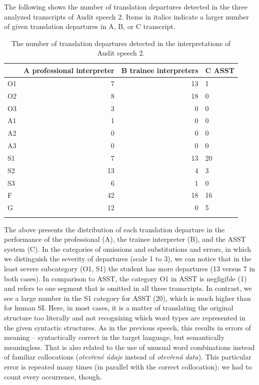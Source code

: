 \documentclass[output=paper]{langscibook}
\begin{document}
The following  shows the number of translation departures detected in the three analyzed transcripts of Audit speech 2. Items in italics indicate a larger number of given translation departures in A, B, or C transcript.

\begin{table}
\begin{tabularx}{\textwidth}{lrrY}
\lsptoprule
 & { {A}} {professional interpreter} & { {B}} {trainee interpreters} & { {C}} {ASST}\\
 \midrule
 {O1} & 7 &  {13} & 1\\
 {O2} & 8 &  {18} & 0\\
 {O3} &  {3} & 0 & 0\\
\tablevspace
 {A1} &  {1} & 0 & 0\\
 {A2} & 0 & 0 & 0\\
 {A3} & 0 & 0 & 0\\
\tablevspace
 {S1} & 7 & 13 & {20}\\
 {S2} & {13} & 4 & 3\\
 {S3} & {6} & 1 & 0\\
\tablevspace
 {F} & {42} & 18 & 16\\
 {G} & {12} & 0 & 5\\
\lspbottomrule
\end{tabularx}
\caption{The number of translation departures detected in the interpretations of Audit speech 2.}
\label{tab:kloudova:7}
\end{table}

The  above presents the distribution of each translation departure in the performance of the professional (A), the trainee interpreter (B), and the ASST system (C). In the categories of omissions and substitutions and errors, in which we distinguish the severity of departures (scale 1 to 3), we can notice that in the least severe subcategory (O1, S1) the student has more departures (13 versus 7 in both cases). In comparison to ASST, the category O1 in ASST is negligible (1) and refers to one segment that is omitted in all three transcripts. In contrast, we see a large number in the S1 category for ASST (20), which is much higher than for human SI. Here, in most cases, it is a matter of translating the original structure too literally and not recognizing which word types are represented in the given syntactic structures. As in the previous speech, this results in errors of meaning – syntactically correct in the target language, but semantically meaningless. That is also related to the use of unusual word combinations instead of familiar collocations (\textit{otevřené údaje} instead of \textit{otevřená data}). This particular error is repeated many times (in parallel with the correct collocation); we had to count every occurrence, though.
\end{document}

